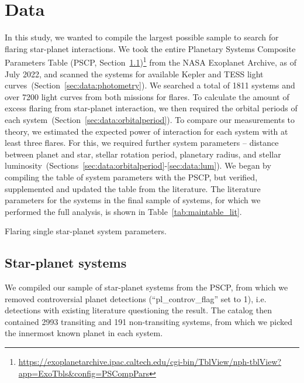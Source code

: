 \documentclass[twocolumn]{aastex631}
\begin{document}
\section{Data}
\label{sec:data}
In this study, we wanted to compile the largest possible sample to search for flaring star-planet interactions. We took the entire Planetary Systems Composite Parameters Table (PSCP, Section~\ref{sec:data:sps})\footnote{ \url{https://exoplanetarchive.ipac.caltech.edu/cgi-bin/TblView/nph-tblView?app=ExoTbls&config=PSCompPars}} from the NASA Exoplanet Archive, as of July 2022, and scanned the systems for available Kepler and TESS light curves~(Section~\ref{sec:data:photometry}). We searched a total of 1811 systems and over 7200 light curves from both missions for flares. To calculate the amount of excess flaring from star-planet interaction, we then required the orbital periods of each system~(Section~\ref{sec:data:orbitalperiod}). To compare our measurements to theory, we estimated the expected power of interaction for each system with at least three flares. For this, we required further system parameters -- distance between planet and star, stellar rotation period, planetary radius, and stellar luminosity~(Sections~\ref{sec:data:orbitalperiod}-\ref{sec:data:lum}). We began by compiling the table of system parameters with the PSCP, but verified, supplemented and updated the table from the literature. The literature parameters for the systems in the final sample of systems, for which we performed the full analysis, is shown in Table~\ref{tab:maintable_lit}.


\begin{table*}
\movetableright=-20mm
\footnotesize
    \caption{Flaring single star-planet system parameters.}
    
        \label{tab:maintable_lit}
    \tablerefs{}
\end{table*}


\subsection{Star-planet systems}
\label{sec:data:sps}
We compiled our sample of star-planet systems from the PSCP, from which we removed controversial planet detections (``pl\_controv\_flag'' set to 1), i.e. detections with existing literature questioning the result. The catalog then contained 2993 transiting and 191 non-transiting systems, from which we picked the innermost known planet in each system. 
\end{document}

